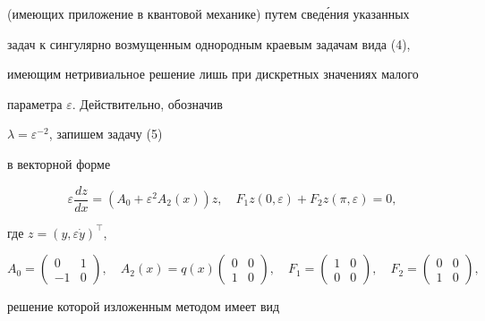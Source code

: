 (имеющих приложение в квантовой механике) путем свед\'ения указанных 


задач к сингулярно возмущенным однородным краевым задачам вида (4), 


имеющим нетривиальное решение лишь при дискретных значениях малого 


параметра $\varepsilon$. Действительно, обозначив 


$\lambda=\varepsilon^{-2}$, запишем задачу (5) 


в векторной форме 


$$ 


\varepsilon\frac{d z}{d x}=(A_0+\varepsilon^2 A_2(x))z,\quad 


F_1 z(0,\varepsilon)+F_2 z(\pi,\varepsilon)=0, 


$$ 


где $z=(y,\varepsilon\Dot y)^\top$, 


$$ 


A_0= 


\begin{pmatrix} 


0 & 1 \\ -1 & 0 


\end{pmatrix} 


,\quad A_2(x)=q(x) 


\begin{pmatrix} 


0 & 0 \\ 1 & 0 


\end{pmatrix} 


,\quad F_1= 


\begin{pmatrix} 


1 & 0 \\ 0 & 0 


\end{pmatrix} 


,\quad F_2= 


\begin{pmatrix} 


0 & 0 \\ 1 & 0 


\end{pmatrix} 


, 


$$ 


решение которой изложенным методом имеет вид 


$$ 


